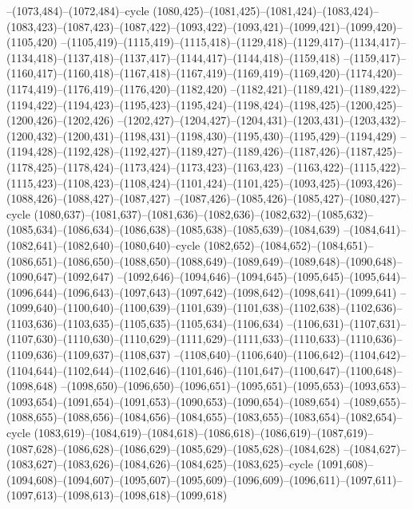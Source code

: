 --(1073,484)--(1072,484)--cycle
(1080,425)--(1081,425)--(1081,424)--(1083,424)--(1083,423)--(1087,423)--(1087,422)--(1093,422)--(1093,421)--(1099,421)--(1099,420)--(1105,420)
--(1105,419)--(1115,419)--(1115,418)--(1129,418)--(1129,417)--(1134,417)--(1134,418)--(1137,418)--(1137,417)--(1144,417)--(1144,418)--(1159,418)
--(1159,417)--(1160,417)--(1160,418)--(1167,418)--(1167,419)--(1169,419)--(1169,420)--(1174,420)--(1174,419)--(1176,419)--(1176,420)--(1182,420)
--(1182,421)--(1189,421)--(1189,422)--(1194,422)--(1194,423)--(1195,423)--(1195,424)--(1198,424)--(1198,425)--(1200,425)--(1200,426)--(1202,426)
--(1202,427)--(1204,427)--(1204,431)--(1203,431)--(1203,432)--(1200,432)--(1200,431)--(1198,431)--(1198,430)--(1195,430)--(1195,429)--(1194,429)
--(1194,428)--(1192,428)--(1192,427)--(1189,427)--(1189,426)--(1187,426)--(1187,425)--(1178,425)--(1178,424)--(1173,424)--(1173,423)--(1163,423)
--(1163,422)--(1115,422)--(1115,423)--(1108,423)--(1108,424)--(1101,424)--(1101,425)--(1093,425)--(1093,426)--(1088,426)--(1088,427)--(1087,427)
--(1087,426)--(1085,426)--(1085,427)--(1080,427)--cycle
(1080,637)--(1081,637)--(1081,636)--(1082,636)--(1082,632)--(1085,632)--(1085,634)--(1086,634)--(1086,638)--(1085,638)--(1085,639)--(1084,639)
--(1084,641)--(1082,641)--(1082,640)--(1080,640)--cycle
(1082,652)--(1084,652)--(1084,651)--(1086,651)--(1086,650)--(1088,650)--(1088,649)--(1089,649)--(1089,648)--(1090,648)--(1090,647)--(1092,647)
--(1092,646)--(1094,646)--(1094,645)--(1095,645)--(1095,644)--(1096,644)--(1096,643)--(1097,643)--(1097,642)--(1098,642)--(1098,641)--(1099,641)
--(1099,640)--(1100,640)--(1100,639)--(1101,639)--(1101,638)--(1102,638)--(1102,636)--(1103,636)--(1103,635)--(1105,635)--(1105,634)--(1106,634)
--(1106,631)--(1107,631)--(1107,630)--(1110,630)--(1110,629)--(1111,629)--(1111,633)--(1110,633)--(1110,636)--(1109,636)--(1109,637)--(1108,637)
--(1108,640)--(1106,640)--(1106,642)--(1104,642)--(1104,644)--(1102,644)--(1102,646)--(1101,646)--(1101,647)--(1100,647)--(1100,648)--(1098,648)
--(1098,650)--(1096,650)--(1096,651)--(1095,651)--(1095,653)--(1093,653)--(1093,654)--(1091,654)--(1091,653)--(1090,653)--(1090,654)--(1089,654)
--(1089,655)--(1088,655)--(1088,656)--(1084,656)--(1084,655)--(1083,655)--(1083,654)--(1082,654)--cycle
(1083,619)--(1084,619)--(1084,618)--(1086,618)--(1086,619)--(1087,619)--(1087,628)--(1086,628)--(1086,629)--(1085,629)--(1085,628)--(1084,628)
--(1084,627)--(1083,627)--(1083,626)--(1084,626)--(1084,625)--(1083,625)--cycle
(1091,608)--(1094,608)--(1094,607)--(1095,607)--(1095,609)--(1096,609)--(1096,611)--(1097,611)--(1097,613)--(1098,613)--(1098,618)--(1099,618)
